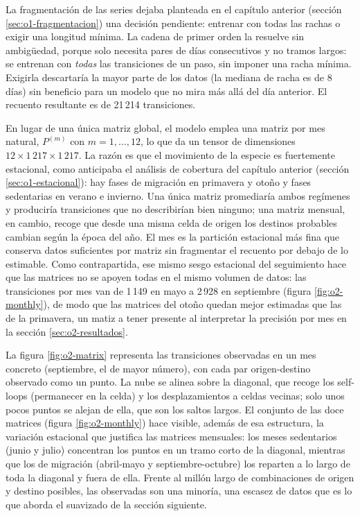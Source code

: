 La fragmentación de las series dejaba planteada en el capítulo anterior (sección
\ref{sec:o1-fragmentacion}) una decisión pendiente: entrenar con todas las rachas o
exigir una longitud mínima.
La cadena de primer orden la resuelve sin ambigüedad, porque solo necesita pares de
días consecutivos y no tramos largos: se entrenan con \emph{todas} las transiciones
de un paso, sin imponer una racha mínima. Exigirla descartaría la mayor parte de los
datos (la mediana de racha es de 8 días) sin beneficio para un modelo que no mira más
allá del día anterior. El recuento resultante es de 21\,214 transiciones.

En lugar de una única matriz global, el modelo emplea una matriz por mes natural,
$P^{(m)}$ con $m = 1, \dots, 12$, lo que da un tensor de dimensiones
$12 \times 1\,217 \times 1\,217$. La razón es que el movimiento de la especie es
fuertemente estacional, como anticipaba el análisis de cobertura del capítulo
anterior (sección \ref{sec:o1-estacional}): hay fases de migración en primavera y
otoño y fases
sedentarias en verano e invierno. Una única matriz promediaría ambos regímenes y
produciría transiciones que no describirían bien ninguno; una matriz mensual, en
cambio, recoge que desde una misma celda de origen los destinos probables cambian
según la época del año. El mes es la partición estacional más fina que conserva
datos suficientes por matriz sin fragmentar el recuento por debajo de lo estimable.
Como contrapartida, ese mismo sesgo estacional del seguimiento hace que las matrices
no se apoyen todas en el mismo volumen de datos: las transiciones por mes van de
1\,149 en mayo a 2\,928 en septiembre (figura \ref{fig:o2-monthly}), de modo que las
matrices del otoño quedan mejor estimadas que las de la primavera, un matiz a tener
presente al interpretar la precisión por mes en la sección \ref{sec:o2-resultados}.

La figura \ref{fig:o2-matrix} representa las transiciones observadas en un mes
concreto (septiembre, el de mayor número), con cada par origen-destino observado como
un punto. La nube se alinea sobre la diagonal, que recoge los self-loops (permanecer
en la celda) y los desplazamientos a celdas vecinas; solo unos pocos puntos se alejan
de ella, que son los saltos largos. El conjunto de las doce matrices (figura
\ref{fig:o2-monthly}) hace visible, además de esa estructura, la variación estacional
que justifica las matrices mensuales: los meses sedentarios (junio y julio) concentran
los puntos en un tramo corto de la diagonal, mientras que los de migración (abril-mayo
y septiembre-octubre) los reparten a lo largo de toda la diagonal y fuera de ella.
Frente al millón largo de combinaciones de origen y destino posibles, las observadas
son una minoría, una escasez de datos que es lo que aborda el suavizado de la sección
siguiente.

